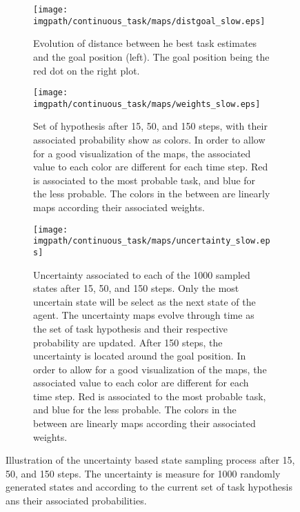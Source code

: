 \begin{figure}[!ht]
\centering
    \begin{subfigure}[b]{\columnwidth}
        \centering
        \texttt{[image: \\imgpath/continuous\_task/maps/distgoal\_slow.eps]}
        \caption{Evolution of distance between he best task estimates and the goal position (left). The goal position being the red dot on the right plot.}
        \label{fig:continuoustaskexampleslowdist}
    \end{subfigure}
    \begin{subfigure}[b]{\columnwidth}
        \centering
        \texttt{[image: \\imgpath/continuous\_task/maps/weights\_slow.eps]}
        \caption{Set of hypothesis after 15, 50, and 150 steps, with their associated probability show as colors. In order to allow for a good visualization of the maps, the associated value to each color are different for each time step. Red is associated to the most probable task, and blue for the less probable. The colors in the between are linearly maps according their associated weights.}
        \label{fig:continuoustaskexampleslowweights}
    \end{subfigure}
    \begin{subfigure}[b]{\columnwidth}
        \centering
        \texttt{[image: \\imgpath/continuous\_task/maps/uncertainty\_slow.eps]}
        \caption{Uncertainty associated to each of the 1000 sampled states after 15, 50, and 150 steps. Only the most uncertain state will be select as the next state of the agent. The uncertainty maps evolve through time as the set of task hypothesis and their respective probability are updated. After 150 steps, the uncertainty is located around the goal position. In order to allow for a good visualization of the maps, the associated value to each color are different for each time step. Red is associated to the most probable task, and blue for the less probable. The colors in the between are linearly maps according their associated weights.}
        \label{fig:continuoustaskexampleslowuncertainty}
    \end{subfigure}
\caption{Illustration of the uncertainty based state sampling process after 15, 50, and 150 steps. The uncertainty is measure for 1000 randomly generated states and according to the current set of task hypothesis ans their associated probabilities.}
\label{fig:continuoustasktasksamplingexampleslow}
\end{figure}
